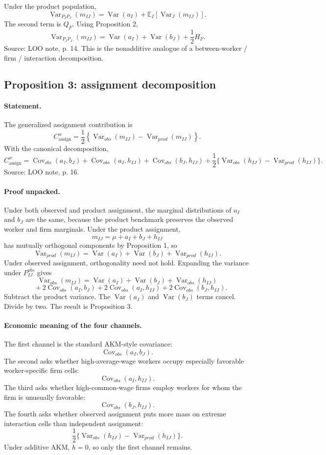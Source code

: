 \documentclass[11pt]{article}
\newcommand{\E}{\mathbb{E}}
\newcommand{\Var}{\operatorname{Var}}
\newcommand{\Cov}{\operatorname{Cov}}
\begin{document}
Under the product population,
\[
\Var_{P_I P_J}(m_{IJ})
=
\Var(a_I)+\E_I[\Var_J(m_{IJ})].
\]
The second term is \(Q_F\). Using Proposition 2,
\[
\Var_{P_I P_J}(m_{IJ})
=
\Var(a_I)+\Var(b_J)+\frac{1}{2}H_F.
\]
Source: LOO note, p. 14. This is the nonadditive analogue of a
between-worker / firm / interaction decomposition.

\subsection{Proposition 3: assignment decomposition}

\paragraph{Statement.}
The generalized assignment contribution is
\[
C^w_{\mathrm{assign}}
=
\frac{1}{2}\left\{
\Var_{obs}(m_{IJ})-\Var_{prod}(m_{IJ})
\right\}.
\]
With the canonical decomposition,
\[
\boxed{
C^w_{\mathrm{assign}}
=
\Cov_{obs}(a_I,b_J)
+\Cov_{obs}(a_I,h_{IJ})
+\Cov_{obs}(b_J,h_{IJ})
+\frac{1}{2}\{\Var_{obs}(h_{IJ})-\Var_{prod}(h_{IJ})\}.
}
\]
Source: LOO note, p. 16.

\paragraph{Proof unpacked.}
Under both observed and product assignment, the marginal distributions of
\(a_I\) and \(b_J\) are the same, because the product benchmark preserves the
observed worker and firm marginals. Under the product assignment,
\[
m_{IJ}=\mu+a_I+b_J+h_{IJ}
\]
has mutually orthogonal components by Proposition 1, so
\[
\Var_{prod}(m_{IJ})
=
\Var(a_I)+\Var(b_J)+\Var_{prod}(h_{IJ}).
\]
Under observed assignment, orthogonality need not hold. Expanding the variance
under \(P^{obs}_{IJ}\) gives
\[
\Var_{obs}(m_{IJ})
=
\Var(a_I)+\Var(b_J)+\Var_{obs}(h_{IJ})
\]
\[
\quad
+2\Cov_{obs}(a_I,b_J)
+2\Cov_{obs}(a_I,h_{IJ})
+2\Cov_{obs}(b_J,h_{IJ}).
\]
Subtract the product variance. The \(\Var(a_I)\) and \(\Var(b_J)\) terms cancel.
Divide by two. The result is Proposition 3.

\paragraph{Economic meaning of the four channels.}
The first channel is the standard AKM-style covariance:
\[
\Cov_{obs}(a_I,b_J).
\]
The second asks whether high-average-wage workers occupy especially favorable
worker-specific firm cells:
\[
\Cov_{obs}(a_I,h_{IJ}).
\]
The third asks whether high-common-wage firms employ workers for whom the firm
is unusually favorable:
\[
\Cov_{obs}(b_J,h_{IJ}).
\]
The fourth asks whether observed assignment puts more mass on extreme
interaction cells than independent assignment:
\[
\frac{1}{2}\{\Var_{obs}(h_{IJ})-\Var_{prod}(h_{IJ})\}.
\]
Under additive AKM, \(h=0\), so only the first channel remains.
\end{document}

